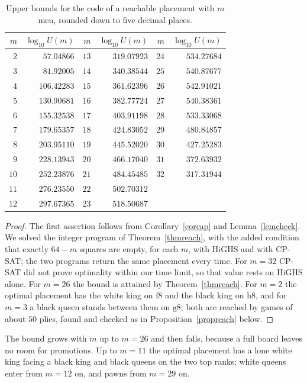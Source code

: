 \documentclass[12pt,reqno]{article}
\newcommand{\sq}[1]{\mathrm{#1}}
\begin{document}
\begin{table}[H]
\begin{center}
\begin{tabular}{r|r||r|r||r|r}
$m$ & $\log_{10}U(m)$ & $m$ & $\log_{10}U(m)$ & $m$ & $\log_{10}U(m)$\\ \hline
$2$ & $57.04866$ & $13$ & $319.07923$ & $24$ & $534.27684$\\
$3$ & $81.92005$ & $14$ & $340.38544$ & $25$ & $540.87677$\\
$4$ & $106.42283$ & $15$ & $361.62396$ & $26$ & $542.91021$\\
$5$ & $130.90681$ & $16$ & $382.77724$ & $27$ & $540.38361$\\
$6$ & $155.32538$ & $17$ & $403.91198$ & $28$ & $533.33068$\\
$7$ & $179.65357$ & $18$ & $424.83052$ & $29$ & $480.84857$\\
$8$ & $203.95110$ & $19$ & $445.52020$ & $30$ & $427.25283$\\
$9$ & $228.13943$ & $20$ & $466.17040$ & $31$ & $372.63932$\\
$10$ & $252.23876$ & $21$ & $484.45485$ & $32$ & $317.31944$\\
$11$ & $276.23550$ & $22$ & $502.70312$ &  & \\
$12$ & $297.67365$ & $23$ & $518.50687$ &  & \\
\end{tabular}
\end{center}
\caption{Upper bounds for the code of a reachable placement with $m$ men, rounded down to
five decimal places.}
\label{tabmen}
\end{table}

\begin{proof}
The first assertion follows from Corollary~\ref{corcap} and Lemma~\ref{lemcheck}. We solved
the integer program of Theorem~\ref{thmreach}, with the added condition that exactly $64-m$
squares are empty, for each $m$, with HiGHS and with CP-SAT; the two programs return the
same placement every time. For $m=32$ CP-SAT did not prove optimality within our time limit, so
that value rests on HiGHS alone. For $m=26$ the bound is attained by Theorem~\ref{thmreach}. For
$m=2$ the optimal placement has the white king on $\sq{f8}$ and the black king on $\sq{h8}$, and
for $m=3$ a black queen stands between them on $\sq{g8}$; both are reached by games of about
$50$ plies, found and checked as in Proposition~\ref{propreach} below.
\end{proof}

The bound grows with $m$ up to $m=26$ and then falls, because a full board leaves no room
for promotions. Up to $m=11$ the optimal placement has a lone white king facing a black king
and black queens on the two top ranks; white queens enter from $m=12$ on, and pawns from
$m=29$ on.
\end{document}
